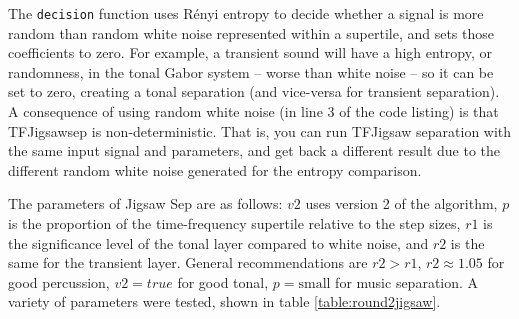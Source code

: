 \documentclass[letter,12pt]{article}
\begin{document}
The \Verb#decision# function uses R{\'e}nyi entropy to decide whether a signal is more random than random white noise represented within a supertile, and sets those coefficients to zero. For example, a transient sound will have a high entropy, or randomness, in the tonal Gabor system -- worse than white noise -- so it can be set to zero, creating a tonal separation (and vice-versa for transient separation). A consequence of using random white noise (in line 3 of the code listing) is that TFJigsawsep is non-deterministic. That is, you can run TFJigsaw separation with the same input signal and parameters, and get back a different result due to the different random white noise generated for the entropy comparison.

The parameters of Jigsaw Sep are as follows: $v2$ uses version 2 of the algorithm, $p$ is the proportion of the time-frequency supertile relative to the step sizes, $r1$ is the significance level of the tonal layer compared to white noise, and $r2$ is the same for the transient layer. General recommendations are $r2 > r1$, $r2 \approx 1.05$ for good percussion, $v2 = true$ for good tonal, $p = \text{small}$ for music separation. A variety of parameters were tested, shown in table \ref{table:round2jigsaw}.
\end{document}
